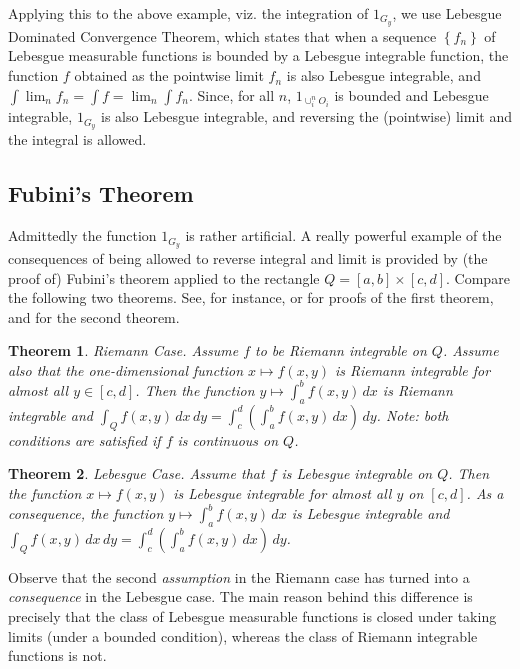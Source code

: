 \documentclass[12pt]{article}
\newtheorem{theorem}{Theorem}[section]
\newcommand{\1}{{{\bf 1}}}
\begin{document}
Applying this to the above example, viz. the integration of
$1_{G_y}$, we use Lebesgue Dominated Convergence Theorem,
which states that when a sequence $\left\{f_n\right\}$ of Lebesgue
measurable functions is bounded by a Lebesgue integrable function, the
function $f$ obtained as the pointwise limit $f_n$ is also Lebesgue
integrable, and $\int \lim_n f_n = \int f = \lim_n \int f_n$. Since,
for all $n$, $1_{\cup_i^n O_i}$ is bounded and Lebesgue
integrable,  $1_{G_y}$ is also Lebesgue integrable,
and reversing the (pointwise) limit and the integral is allowed.


\subsection{Fubini's Theorem}
\label{sec:fubinis-theorem}

Admittedly the function $1_{G_y}$ is rather artificial. 
A really powerful example of the consequences of being allowed to
reverse integral and limit is provided by (the proof of)
Fubini's theorem applied to the rectangle $Q=[a,b] \times [c,d]$.
Compare the following two theorems.  See, for instance,
\cite{apostol69:_calcul} or \cite{lang83:_under_analy} for proofs of
the first theorem, and \cite{jones00:_lebes_integ_euclid_spaces} for
the second theorem.

\begin{theorem}
  \label{thr:3}
  Riemann Case. Assume $f$ to be Riemann integrable on $Q$. Assume
  also that the one-dimensional function $x\mapsto f(x,y)$ is Riemann
  integrable for almost all $y\in[c,d]$. Then the function $y\mapsto
  \int_a^b f(x,y) \,dx$ is Riemann integrable and $\int_Q f(x,y) \,dx
  \,dy = \int_c^d \left(\int_a^b f(x,y) \,dx\right) \,dy$.  Note: both
  conditions are satisfied if $f$ is continuous on $Q$.
\end{theorem}

\begin{theorem}
  Lebesgue Case. Assume that $f$ is Lebesgue integrable on $Q$. Then
  the function $x\mapsto f(x,y)$ is Lebesgue integrable for almost all
  $y$ on $[c,d]$. As a consequence, the function $y\mapsto \int_a^b
  f(x,y) \,dx$ is Lebesgue integrable and $\int_Q f(x,y) \,dx \,dy =
  \int_c^d \left(\int_a^b f(x,y) \,dx\right) \,dy$.
\end{theorem}

Observe that the second \emph{assumption} in the Riemann case has
turned into a \emph{consequence} in the Lebesgue case.  The main
reason behind this difference is precisely that the class of Lebesgue
measurable functions is closed under taking limits (under a bounded
condition), whereas the class of Riemann integrable functions is not.
\end{document}
